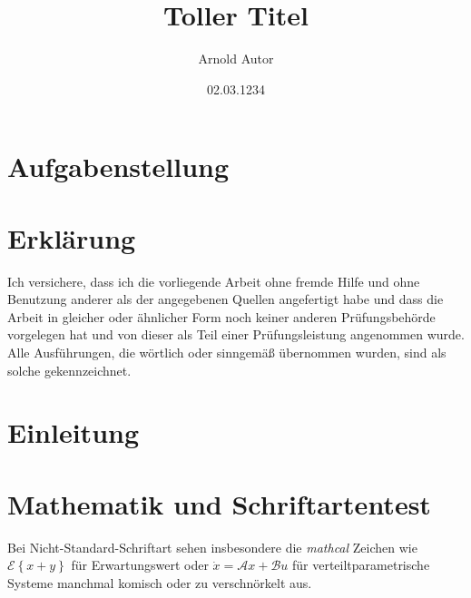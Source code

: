 \documentclass[draft]{max-masterarbeit} %
\title{Toller Titel}
\author{Arnold Autor}
\date{02.03.1234}
\begin{document}
\frontmatter
{} %

\titelseiteLRT
\pagestyle{empty}
\cleardoublepage
\chapter*{Aufgabenstellung}
\thispagestyle{empty}
\cleardoublepage
\chapter*{Erklärung}
\thispagestyle{empty}
Ich versichere, dass ich die vorliegende Arbeit ohne fremde Hilfe und ohne Benutzung anderer als
der angegebenen Quellen angefertigt habe und dass die Arbeit in gleicher oder ähnlicher Form noch
keiner anderen Prüfungsbehörde vorgelegen hat und von dieser als Teil einer Prüfungsleistung
angenommen wurde. Alle Ausführungen, die wörtlich oder sinngemäß übernommen wurden, sind als 
solche gekennzeichnet.

\vspace{4.5em}

\makeatletter
\let\thedate\@date
\let\theauthor\@author
\makeatother
\newcommand{\unterschriftsbreite}{.35\linewidth}
%

\cleardoublepage
{}
\pagestyle{scrheadings}
\tableofcontents



\mainmatter
\chapter{Einleitung}


\chapter{Mathematik und Schriftartentest}
Bei Nicht-Standard-Schriftart sehen insbesondere die \emph{mathcal} Zeichen wie $\mathcal{E}\left\{x+y\right\}$ für Erwartungswert oder $\dot x = \mathcal{A} x + \mathcal{B} u$ für verteiltparametrische Systeme manchmal komisch oder zu verschnörkelt aus.
\end{document}
